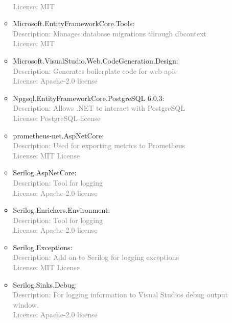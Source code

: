 \documentclass[10pt]{article}
\begin{document}
\begin{itemize}
\begin{itemize}
        \\\textcolor{gray}{License: MIT}
        \item Microsoft.EntityFrameworkCore.Tools:
        \\\textcolor{gray}{Description: Manages database migrations through dbcontext}
        \\\textcolor{gray}{License: MIT}
        \item Microsoft.VisualStudio.Web.CodeGeneration.Design:
        \\\textcolor{gray}{Description: Generates boilerplate code for web apis}
        \\\textcolor{gray}{License: Apache-2.0 license}
        \item Npgsql.EntityFrameworkCore.PostgreSQL
6.0.3:
        \\\textcolor{gray}{Description: Allows .NET to interact with PostgreSQL}
        \\\textcolor{gray}{License: PostgreSQL license}
        
        \item prometheus-net.AspNetCore:
        \\\textcolor{gray}{Description: Used for exporting metrics to Prometheus}
        \\\textcolor{gray}{License: MIT License}
        
        \item Serilog.AspNetCore:
        \\\textcolor{gray}{Description: Tool for logging}
        \\\textcolor{gray}{License: Apache-2.0 license}
        
        \item Serilog.Enrichers.Environment:
        \\\textcolor{gray}{Description: Tool for logging}
        \\\textcolor{gray}{License: Apache-2.0 license}
        
        \item Serilog.Exceptions:
        \\\textcolor{gray}{Description: Add on to Serilog for logging exceptions}
        \\\textcolor{gray}{License: MIT License}
        
        \item Serilog.Sinks.Debug:
        \\\textcolor{gray}{Description: For logging information to Visual Studios debug output window.}
        \\\textcolor{gray}{License: Apache-2.0 license}
        

\end{itemize}
\end{itemize}
\end{document}
